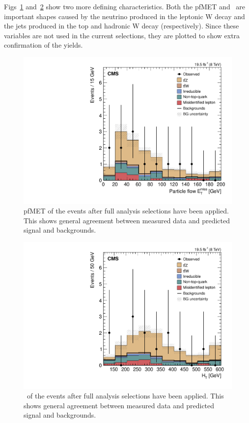 Figs~\ref{fig:hpfMET_3l2j2b} and~\ref{fig:hHt_3l2j2b} show two more defining characteristics. Both the pfMET and \HT \ are important shapes caused by the neutrino produced in the leptonic W decay and the jets produced in the top and hadronic W decay (respectively). Since these variables are not used in the current selections, they are plotted to show extra confirmation of the yields.

\begin{figure}[h]
\begin{center}
\includegraphics[width=0.6\linewidth]{Figs/Plots_Final_Selections/hpfMET_3L2J2b.pdf}
\caption{\label{fig:hpfMET_3l2j2b}
pfMET of the events after full analysis selections have been applied. This shows general agreement between measured data and predicted signal and backgrounds. 
}
\end{center}
\end{figure} 

\begin{figure}[h]
\begin{center}
\includegraphics[width=0.7\linewidth]{Figs/Plots_Final_Selections/hHt_3L2J2b.pdf}
\caption{\label{fig:hHt_3l2j2b}
\HT \ of the events after full analysis selections have been applied. This shows general agreement between measured data and predicted signal and backgrounds. 
}
\end{center}
\end{figure} 















